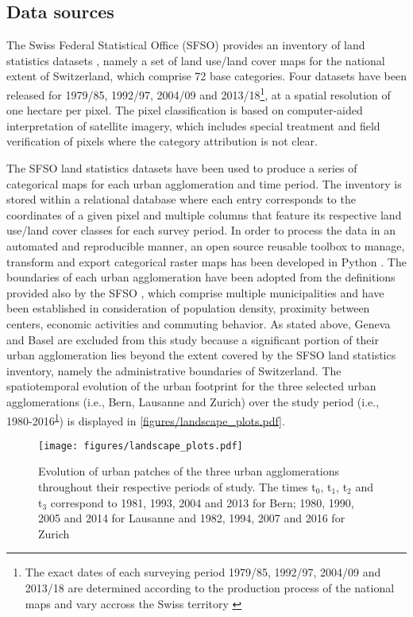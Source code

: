 \documentclass[10pt,letterpaper]{article}
\begin{document}
\subsection*{Data sources}

The Swiss Federal Statistical Office (SFSO) provides an inventory of land statistics datasets \cite{sfso2017statistique}, namely a set of land use/land cover maps for the national extent of Switzerland, which comprise 72 base categories. Four datasets have been released for 1979/85, 1992/97, 2004/09 and 2013/18\footnote{\label{fn:years}The exact dates of each surveying period 1979/85, 1992/97, 2004/09 and 2013/18 are determined according to the production process of the national maps and vary accross the Swiss territory \cite{sfso2017statistique}}, at a spatial resolution of one hectare per pixel.
The pixel classification is based on computer-aided interpretation of satellite imagery, which includes special treatment and field verification of pixels where the category attribution is not clear.

The SFSO land statistics datasets have been used to produce a series of categorical maps for each urban agglomeration and time period.
The inventory is stored within a relational database where each entry corresponds to the coordinates of a given pixel and multiple columns that feature its respective land use/land cover classes for each survey period. In order to process the data in an automated and reproducible manner, an open source reusable toolbox to manage, transform and export categorical raster maps has been developed in Python \cite{bosch2019swisslandstats}.
The boundaries of each urban agglomeration have been adopted from the definitions provided also by the SFSO \cite{sfso2014espace}, which comprise multiple municipalities and have been established in consideration of population density, proximity between centers, economic activities and commuting behavior.
As stated above, Geneva and Basel are excluded from this study because a significant portion of their urban agglomeration lies beyond the extent covered by the SFSO land statistics inventory, namely the administrative boundaries of Switzerland.
The spatiotemporal evolution of the urban footprint for the three selected urban agglomerations (i.e., Bern, Lausanne and Zurich) over the study period (i.e., 1980-2016\textsuperscript{\ref{fn:years}}) is displayed in \autoref{figures/landscape_plots.pdf}.

\begin{figure}[!ht]
  \begin{adjustwidth}{-.4\textwidth}{0cm}
    \centering  
    \texttt{[image: figures/landscape\_plots.pdf]}
    \caption[Evolution of urban patches]{\label{figures/landscape_plots.pdf}Evolution of urban patches of the three urban agglomerations throughout their respective periods of study. The times t$_0$, t$_1$, t$_2$ and t$_3$ correspond to 1981, 1993, 2004 and 2013 for Bern; 1980, 1990, 2005 and 2014 for Lausanne and 1982, 1994, 2007 and 2016 for Zurich}
  \end{adjustwidth}
\end{figure}
\end{document}
